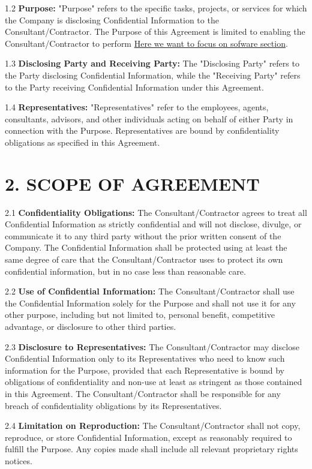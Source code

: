 \documentclass[12pt]{article}
\begin{document}
1.2 \textbf{Purpose:} "Purpose" refers to the specific tasks, projects, or services for which the Company is disclosing Confidential Information to the Consultant/Contractor. The Purpose of this Agreement is limited to enabling the Consultant/Contractor to perform \underline{Here we want to focus on sofware section}.

1.3 \textbf{Disclosing Party and Receiving Party:} The "Disclosing Party" refers to the Party disclosing Confidential Information, while the "Receiving Party" refers to the Party receiving Confidential Information under this Agreement.

1.4 \textbf{Representatives:} "Representatives" refer to the employees, agents, consultants, advisors, and other individuals acting on behalf of either Party in connection with the Purpose. Representatives are bound by confidentiality obligations as specified in this Agreement.

\section*{2. SCOPE OF AGREEMENT}

2.1 \textbf{Confidentiality Obligations:} The Consultant/Contractor agrees to treat all Confidential Information as strictly confidential and will not disclose, divulge, or communicate it to any third party without the prior written consent of the Company. The Confidential Information shall be protected using at least the same degree of care that the Consultant/Contractor uses to protect its own confidential information, but in no case less than reasonable care.

2.2 \textbf{Use of Confidential Information:} The Consultant/Contractor shall use the Confidential Information solely for the Purpose and shall not use it for any other purpose, including but not limited to, personal benefit, competitive advantage, or disclosure to other third parties.

2.3 \textbf{Disclosure to Representatives:} The Consultant/Contractor may disclose Confidential Information only to its Representatives who need to know such information for the Purpose, provided that each Representative is bound by obligations of confidentiality and non-use at least as stringent as those contained in this Agreement. The Consultant/Contractor shall be responsible for any breach of confidentiality obligations by its Representatives.

2.4 \textbf{Limitation on Reproduction:} The Consultant/Contractor shall not copy, reproduce, or store Confidential Information, except as reasonably required to fulfill the Purpose. Any copies made shall include all relevant proprietary rights notices.
\end{document}
